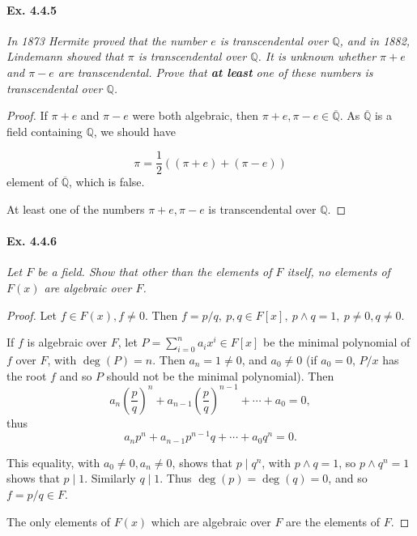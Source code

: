 \documentclass[11pt,a4paper]{article}
\newcommand{\Q}{\mathbb{Q}}
\begin{document}
\paragraph{Ex. 4.4.5}

{\it In 1873 Hermite proved that the number $e$ is transcendental over $\Q$, and in 1882, Lindemann showed that $\pi$ is transcendental over $\Q$. It is unknown whether $\pi+e$ and $\pi-e$ are transcendental. Prove that {\bf at least} one of these numbers is transcendental over $\Q$.
}

\begin{proof}
If $\pi+e$ and $\pi -e$ were both algebraic, then  $\pi+e,\pi -e \in \overline{\Q}$.  As $\overline{\Q}$ is a field containing $\Q$, we should have

$$\pi = \frac{1}{2}\left( (\pi+e) + (\pi-e)\right) $$
element of $\overline{\Q}$, which is false.

At least one of the numbers $\pi+e,\pi-e$ is transcendental over $\Q$.

\end{proof}

\paragraph{Ex. 4.4.6}

{\it Let $F$ be a field. Show that other than the elements of $F$ itself, no elements of $F(x)$ are algebraic over $F$.
}

\begin{proof}
Let $f \in F(x), f\neq 0$. Then $f =p/q,\  p,q \in F[x], \ p \wedge q = 1,\  p\neq 0, q\neq 0$.

If $f$ is algebraic over $F$, let $P  = \sum_{i=0}^n a_i x^i \in F[x]$ be the minimal polynomial of $f$ over $F$, with $\deg(P) = n$. Then $a_n = 1 \neq 0$, and $a_0 \neq 0$ (if $a_0 = 0$,  $P/x$ has the root $f$ and so $P$ should not be the minimal polynomial). Then 
$$a_{n}\left ( \frac{p}{q}\right )^n+a_{n-1}\left ( \frac{p}{q}\right )^{n-1}+\cdots+a_0 = 0,$$
thus   $$a_n p^n + a_{n-1} p^{n-1}q+\cdots+a_0 q^n = 0.$$

This equality, with $a_0 \neq 0, a_n \neq 0$, shows that $p \mid q^n$, with $p\wedge q= 1$, so $p \wedge q^n=1$ shows that $p \mid 1$. Similarly $q\mid 1$. Thus $\deg(p) =\deg(q) =0$, and so $f=p/q \in F$.

The only elements of $F(x)$ which are algebraic over $F$ are the elements of $F$.
\end{proof}
\end{document}
